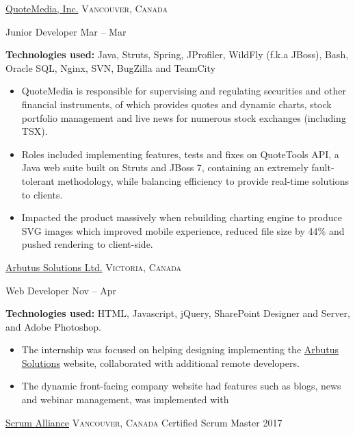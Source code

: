 \documentclass[10pt,a4paper]{article}
\begin{document}
\headedsection  %
  {\href{https://www.quotemedia.com/}{QuoteMedia, Inc.}}
  {\textsc{Vancouver, Canada}} {
  \headedsubsection
    {Junior Developer}
    {Mar  -- Mar }
    {\noindent
    
   \textbf{Technologies used:}   Java, Struts, Spring, JProfiler, WildFly (f.k.a JBoss), Bash, Oracle SQL, Nginx, SVN, BugZilla and TeamCity \begin{itemize}  
\item QuoteMedia is responsible for supervising and regulating securities and other financial instruments, of which provides quotes and dynamic charts, stock portfolio management and live news for numerous stock exchanges (including TSX).
\item Roles included implementing features, tests and fixes on QuoteTools API, a Java web suite built on Struts and JBoss 7, containing an extremely
fault-tolerant methodology, while balancing efficiency to provide real-time solutions to clients.
\item Impacted the product massively when rebuilding charting engine to produce SVG images which improved mobile
experience, reduced file size by 44\% and pushed rendering to client-side.
\end{itemize}}
}

\headedsection  %
  {\href{http://arbutussolutions.com/}{Arbutus Solutions Ltd.}}
  {\textsc{Victoria, Canada}} {
  \headedsubsection
    {Web Developer}
    {Nov  -- Apr }
    {\noindent
    
   \textbf{Technologies used:}    HTML, Javascript, jQuery, SharePoint Designer and Server, and Adobe Photoshop.\begin{itemize}   
\item The internship was focused on helping designing implementing the \href{http://arbutussolutions.com/}{Arbutus Solutions} website, collaborated with additional remote developers.
\item The dynamic front-facing company website had features such as blogs, news and webinar management, was implemented with
\end{itemize}}
}

\vspace{1em}
\spacedhrule{0em}{-0.4em}

\headedsection
  {\href{https://www.scrumalliance.org/}{Scrum Alliance}}
  {\textsc{Vancouver, Canada}} {
  \headedsubsection
    {Certified Scrum Master}
    {2017}
    {}
}
\end{document}
